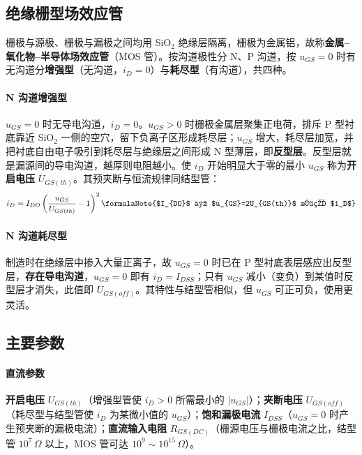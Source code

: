 \subsection{绝缘栅型场效应管}

栅极与源极、栅极与漏极之间均用 SiO$_2$ 绝缘层隔离，栅极为金属铝，故称\textbf{金属--氧化物--半导体场效应管}（MOS 管）。按沟道极性分 N、P 沟道，按 $u_{GS}=0$ 时有无沟道分\textbf{增强型}（无沟道，$i_D=0$）与\textbf{耗尽型}（有沟道），共四种。

\paragraph{N 沟道增强型} $u_{GS}=0$ 时无导电沟道，$i_D=0$。$u_{GS}>0$ 时栅极金属层聚集正电荷，排斥 P 型衬底靠近 SiO$_2$ 一侧的空穴，留下负离子区形成耗尽层；$u_{GS}$ 增大，耗尽层加宽，并把衬底自由电子吸引到耗尽层与绝缘层之间形成 N 型薄层，即\textbf{反型层}。反型层就是漏源间的导电沟道，越厚则电阻越小。使 $i_D$ 开始明显大于零的最小 $u_{GS}$ 称为\textbf{开启电压} $U_{GS(th)}$。其预夹断与恒流规律同结型管：
\begin{equation}
i_D = I_{DO}\left(\frac{u_{GS}}{U_{GS(th)}}-1\right)^2
\formulaNote{$I_{DO}$ 为 $u_{GS}=2U_{GS(th)}$ 时的 $i_D$}
\end{equation}

\paragraph{N 沟道耗尽型} 制造时在绝缘层中掺入大量正离子，故 $u_{GS}=0$ 时已在 P 型衬底表层感应出反型层，\textbf{存在导电沟道}，$u_{GS}=0$ 即有 $i_D=I_{DSS}$；只有 $u_{GS}$ 减小（变负）到某值时反型层才消失，此值即 $U_{GS(off)}$。其特性与结型管相似，但 $u_{GS}$ 可正可负，使用更灵活。

\subsection{主要参数}

\paragraph{直流参数} \textbf{开启电压} $U_{GS(th)}$（增强型管使 $i_D>0$ 所需最小的 $|u_{GS}|$）；\textbf{夹断电压} $U_{GS(off)}$（耗尽型与结型管使 $i_D$ 为某微小值的 $u_{GS}$）；\textbf{饱和漏极电流} $I_{DSS}$（$u_{GS}=0$ 时产生预夹断的漏极电流）；\textbf{直流输入电阻} $R_{GS(DC)}$（栅源电压与栅极电流之比，结型管 $10^7\,\Omega$ 以上，MOS 管可达 $10^{9}\sim10^{15}\,\Omega$）。

